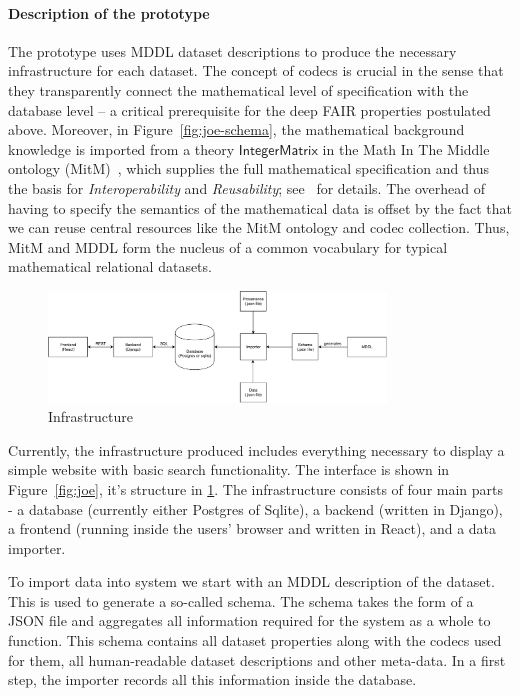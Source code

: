 \paragraph{Description of the \dmh prototype}
The prototype uses MDDL dataset descriptions to produce the necessary infrastructure for each dataset.
The concept of codecs is crucial in the sense that they transparently connect 
the mathematical level of specification with the database level -- 
a critical prerequisite for the deep FAIR properties postulated above.
Moreover, in Figure~\ref{fig:joe-schema}, the mathematical background knowledge is 
imported from a theory $\mathsf{IntegerMatrix}$ in the Math In The Middle ontology (MitM)~\cite{MitM:on}, 
which supplies the full mathematical specification and thus the basis for \emph{Interoperability} and \emph{Reusability}; see~\cite{BerKohRab:tumdi19,WieKohRab:vtuimkb17,KohMuePfe:kbimss17} for details.
The overhead of having to specify the semantics of the mathematical data is offset by the fact that we can reuse central resources like the MitM ontology and codec collection. 
Thus, MitM and MDDL form the nucleus of a common vocabulary for typical mathematical relational datasets. 

\begin{figure}[ht]
  \includegraphics[width=0.8\textwidth]{DMH_infra.pdf}
  \caption{\dmh Infrastructure}\label{fig:dmhstruct}
\end{figure}

Currently, the infrastructure produced includes everything necessary to display a simple website with basic search functionality. 
The interface is shown in Figure~\ref{fig:joe}, it's structure in \ref{fig:dmhstruct}. 
The infrastructure consists of four main parts - a database (currently either Postgres of Sqlite), a backend (written in Django), a frontend (running inside the users' browser and written in React), and a data importer.

To import data into system we start with an MDDL description of the dataset. 
This is used to generate a so-called schema. 
The schema takes the form of a JSON file and aggregates all information required for the system as a whole to function. 
This schema contains all dataset properties along with the codecs used for them, all human-readable dataset descriptions and other meta-data. 
In a first step, the importer records all this information inside the database. 

